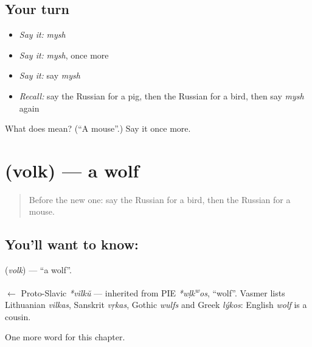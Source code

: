 \subsection*{Your turn}
\begin{itemize}
\raggedright
  \item \emph{Say it:} \emph{mysh}
  \item \emph{Say it:} \emph{mysh}, once more
  \item \emph{Say it:} say \emph{mysh}
  \item \emph{Recall:} say the Russian for a pig, then the Russian for a bird, then say \emph{mysh} again
\end{itemize}

\begin{tcolorbox}[breakable,colback=teal!4,colframe=teal!35!black,title={Before you move on}]
What does  mean? (\textquotedblleft{}A mouse\textquotedblright{}.) Say it once more.
\end{tcolorbox}
\section[\texorpdfstring{\ru{волк} (volk)}{волк (volk)}]{ (volk) — a wolf}

\label{lesson:RU-C61-wolf}



\begin{quote}
Before the new one: say the Russian for a bird, then the Russian for a mouse.
\end{quote}

\subsection*{You'll want to know: }
\textbf{} (\emph{volk}) — \textquotedblleft{}a wolf\textquotedblright{}.

\begin{cousinweb}
\textbf{} $\leftarrow$ Proto-Slavic \emph{*vĭlkŭ} — inherited from PIE \emph{*wḷk\textsuperscript{w}os}, \textquotedblleft{}wolf\textquotedblright{}. Vasmer lists Lithuanian \emph{vilkas}, Sanskrit \emph{vṛkas}, Gothic \emph{wulfs} and Greek \emph{lýkos}: English \emph{wolf} is a cousin.
\end{cousinweb}

\begin{grammarlens}[title={What you've built}]
One more word for this chapter.
\end{grammarlens}

